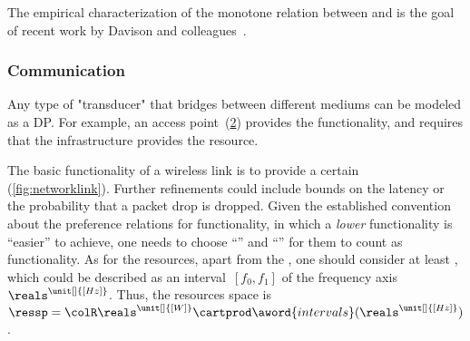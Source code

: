 \begin{figure}[h]
    \centering
    \caption{}
    \label{fig:progressive}
\end{figure}

\begin{example}
    The empirical characterization of the monotone relation between  and  is the goal of recent work by Davison and colleagues~\cite{nardi15introducing,zia16comparative}.
\end{example}

\subsubsection{Communication}

\begin{example}[Transducers]
    Any type of "transducer" that bridges between different mediums can be modeled as a DP.
    For example, an access point~(\cref{fig:accesspoint}) provides the  functionality, and requires that the infrastructure provides the  resource.
\end{example}

\begin{figure}[h]
    \centering
    \caption{}
    \label{fig:accesspoint}
\end{figure}

\begin{example}
    The basic functionality of a wireless link is to provide a certain  (\cref{fig:networklink}).
    Further refinements could include bounds on the latency or the probability that a packet drop is dropped.
    Given the established convention about the preference relations for functionality, in which a \emph{lower} functionality is ``easier''
    to achieve, one needs to choose ``'' and ``'' for them to count as functionality.
    As for the resources, apart from the , one should consider at least , which could be described as an interval~$[f_0,f_1]$ of the frequency axis $\reals^{\unit[]{[Hz]}}$.
    Thus, the resources space is $\ressp=\colR\reals^{\unit[]{[W]}}\cartprod\aword{intervals}(\reals^{\unit[]{[Hz]}})$.
\end{example}
\begin{figure*}[h]
    \centering
    \caption{ }
    \label{fig:networklink}
\end{figure*}

